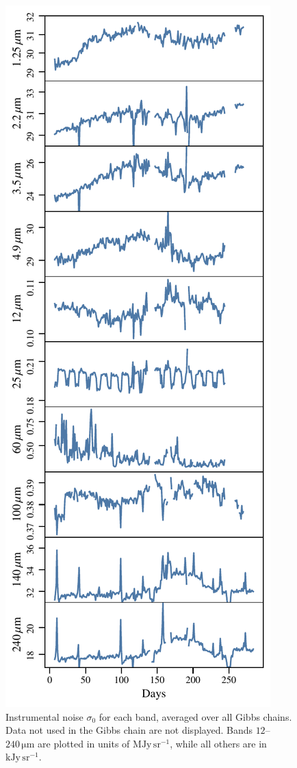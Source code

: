 \documentclass{aa}
\begin{document}
\begin{figure}
	\centering
	\includegraphics[width=\columnwidth]{figs/sigma0_bands.pdf}
	\caption{Instrumental noise $\sigma_0$ for each band, averaged over all Gibbs chains. Data not used in the Gibbs chain are not displayed. Bands $12$--$240\,\mathrm{\mu m}$ are plotted in units of $\mathrm{MJy\,sr^{-1}}$, while all others are in $\mathrm{kJy\,sr^{-1}}$.}
	\label{fig:sigma0}
\end{figure}
\end{document}
